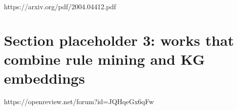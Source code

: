 https://arxiv.org/pdf/2004.04412.pdf

\section{Section placeholder 3: works that combine rule mining and KG embeddings}
https://openreview.net/forum?id=JQHqeGx6qFw